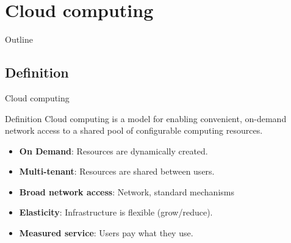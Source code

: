 
\section{Cloud computing}
\begin{frame}{Outline}
\end{frame}
\subsection{Definition}

\begin{frame}{Cloud computing}
\begin{block}{Definition}
Cloud computing is a model for enabling convenient, on-demand network access to a shared pool of configurable computing resources.
\end{block}
\begin{itemize}
  \item \textbf{On Demand}: Resources are dynamically created.
  \item \textbf{Multi-tenant}: Resources are shared between users.
  \item \textbf{Broad network access}: Network, standard mechanisms
  \item \textbf{Elasticity}: Infrastructure is flexible (grow/reduce).
  \item \textbf{Measured service}: Users pay what they use.
\end{itemize}
\end{frame}

